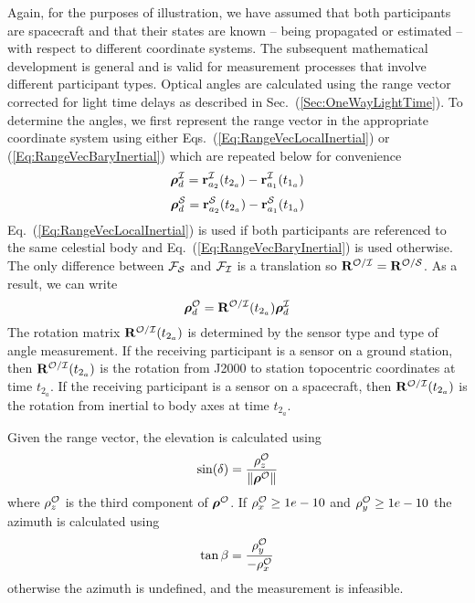 Again, for the purposes of illustration, we have assumed that both participants
are spacecraft and that their states are known -- being propagated or estimated -- with respect to different coordinate systems.  The subsequent mathematical development is general and is valid for measurement processes that involve
different participant types.  Optical angles are calculated using the range vector corrected for light time delays as described in Sec.~(\ref{Sec:OneWayLightTime}).  To determine the angles, we first represent the range vector in the appropriate coordinate system using either Eqs.~(\ref{Eq:RangeVecLocalInertial}) or (\ref{Eq:RangeVecBaryInertial})
which are repeated below for convenience
%
\begin{equation}
      \boldsymbol{\rho}_{d}^\mcI = \mathbf{r}_{a_{2}}^{\mcI}(t_{2_{a}}) - \mathbf{r}_{a_{1}}^{\mcI}(t_{1_{a}}) \nonumber
\end{equation}
%
\begin{equation}
     \boldsymbol{\rho}_{d}^\mcS = \mathbf{r}_{a_{2}}^{\mcS}(t_{2_{a}}) - \mathbf{r}_{a_{1}}^{\mcS}(t_{1_{a}}) \nonumber
\end{equation}
%
Eq.~(\ref{Eq:RangeVecLocalInertial}) is used if both participants are referenced to the same celestial body and Eq.~(\ref{Eq:RangeVecBaryInertial}) is used otherwise.  The only difference between $\mcF_\mcS$ and $\mcF_\mcI$ is a translation so $\mathbf{R}^{\mcO/\mcI} = \mathbf{R}^{\mcO/\mcS}$.  As a result, we can write
%
\begin{equation}
      \boldsymbol{\rho}_{d}^{\mcO} = \mathbf{R}^{{\mcO}/{\mcI}}(t_{2_{a}})\boldsymbol{\rho}_{d}^{\mcI} \label{Eq:RangeforAngles}
\end{equation}
%
The rotation matrix $\mathbf{R}^{{\mcO}/{\mcI}}(t_{2_{a}})$ is determined by the sensor type and type of angle measurement. If the receiving participant is a sensor on a ground station, then $\mathbf{R}^{{\mcO}/{\mcI}}(t_{2_{a}})$
is the rotation from J2000 to station topocentric coordinates at time $t_{2_{a}}$. If the receiving participant is a sensor on a spacecraft, then $\mathbf{R}^{{\mcO}/{\mcI}}(t_{2_{a}})$ is the rotation from inertial to body axes at time $t_{2_{a}}$.

Given the range vector, the elevation is calculated using
%
\begin{equation}
    \sin(\delta) = \frac{\rho_z^{\mcO}}{ \|\boldsymbol{\rho}^{\mcO}\|}
\end{equation}
%
where $\rho_z^{\mcO}$ is the third component of $\boldsymbol{\rho}^{\mcO}$. If
$\rho_x^{\mcO} \geq 1e-10$ and $\rho_y^{\mcO} \geq 1e-10$ the azimuth is calculated using
%
\begin{equation}
    \tan{\beta} = \frac{ \rho_y^{\mcO}}{- \rho_x^{\mcO}}
\end{equation}
%
otherwise the azimuth is undefined, and the measurement is infeasible.


